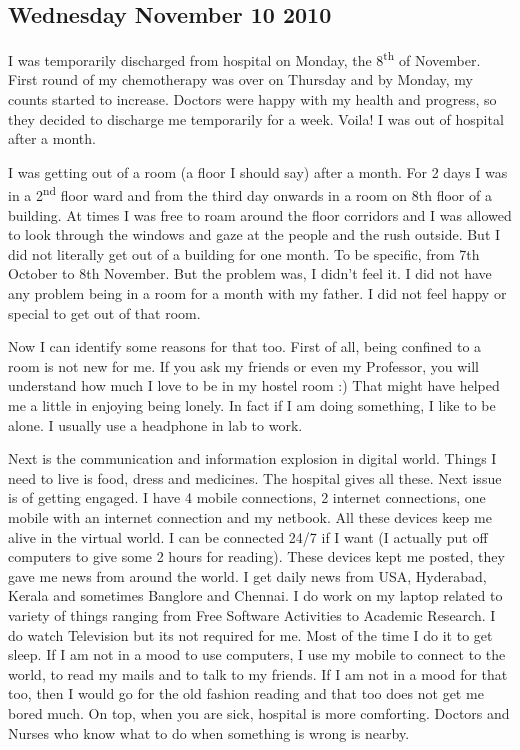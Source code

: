 \vskip 2pt
{\engtext
\subsection*{Wednesday November 10 2010}

I was temporarily discharged from hospital on Monday, the 8\textsuperscript{th} of November. First round of my chemotherapy 
was over on Thursday and by Monday, my counts started to increase. Doctors were happy with my health and 
progress, so they decided to discharge me temporarily for a week. Voila! I was out of hospital after a month. 

I was getting out of a room (a floor I should say) after a month. For 2 days I was in a 2\textsuperscript{nd} floor ward and from 
the third day onwards in a room on 8th floor of a building. At times I was free to roam around the floor corridors 
and I was allowed to look through the windows and gaze at the people and the rush outside. But I did not literally 
get out of a building for one month. To be specific, from 7th October to 8th November. But the problem was, I didn't 
feel it. I did not have any problem being in a room for a month with my father. I did not feel happy or special to 
get out of that room. 

Now I can identify some reasons for that too. First of all, being confined to a room is not new for me. If you ask 
my friends or even my Professor, you will understand how much I love to be in my hostel room :) That might 
have helped me a little in enjoying being lonely. In fact if I am doing something, I like to be alone. I usually use a 
headphone in lab to work.  

Next is the communication and information explosion in digital world. Things I need to live is food, dress and 
medicines. The hospital gives all these. Next issue is of getting engaged. I have 4 mobile connections, 2 internet 
connections, one mobile with an internet connection and my netbook. All these devices keep me alive in the virtual 
world. I can be connected 24/7 if I want (I actually put off computers to give some 2 hours for reading). These 
devices kept me posted, they gave me news from around the world. I get daily news from USA, Hyderabad, Kerala 
and sometimes Banglore and Chennai. I do work on my laptop related to variety of things ranging from Free Software
Activities to Academic Research. I do watch Television but its not required for me. Most of the time I do it to get 
sleep. If I am not in a mood to use computers, I use my mobile to connect to the world, to read my mails and to talk 
to my friends. If I am not in a mood for that too, then I would go for the old fashion reading and that too does not 
get me bored much. On top, when you are sick, hospital is more comforting. Doctors and Nurses who know what 
to do when something is wrong is nearby.

}
